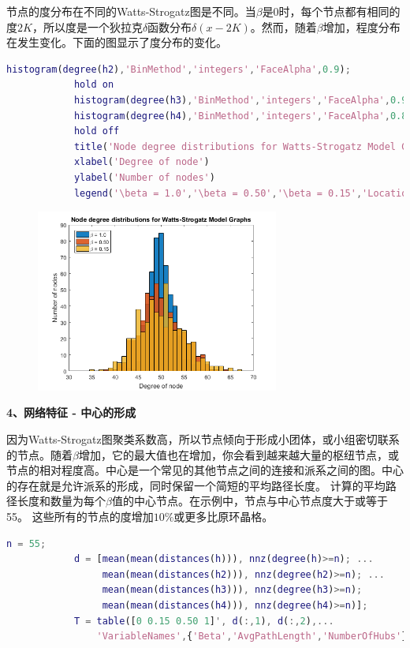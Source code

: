             \par
            节点的度分布在不同的Watts-Strogatz图是不同。当$\beta$是0时，每个节点都有相同的度$2K$，所以度是一个狄拉克$\delta$函数分布$\delta(x-2K)$。然而，随着$\beta$增加，程度分布在发生变化。下面的图显示了度分布的变化。
            \begin{lstlisting}[language=Matlab]
            histogram(degree(h2),'BinMethod','integers','FaceAlpha',0.9);
            hold on
            histogram(degree(h3),'BinMethod','integers','FaceAlpha',0.9);
            histogram(degree(h4),'BinMethod','integers','FaceAlpha',0.8);
            hold off
            title('Node degree distributions for Watts-Strogatz Model Graphs')
            xlabel('Degree of node')
            ylabel('Number of nodes')
            legend('\beta = 1.0','\beta = 0.50','\beta = 0.15','Location','NorthWest')
             \end{lstlisting}
            \begin{figure}[H]
            \centering
            \includegraphics[height=6cm]{images/40.jpg}
            \end{figure}
            \textbf{4、网络特征 - 中心的形成}
            \par
            因为Watts-Strogatz图聚类系数高，所以节点倾向于形成小团体，或小组密切联系的节点。随着$\beta$增加，它的最大值也在增加，你会看到越来越大量的枢纽节点，或节点的相对程度高。中心是一个常见的其他节点之间的连接和派系之间的图。中心的存在就是允许派系的形成，同时保留一个简短的平均路径长度。
            计算的平均路径长度和数量为每个$\beta$值的中心节点。在示例中，节点与中心节点度大于或等于55。 这些所有的节点的度增加$10\%$或更多比原环晶格。
            \begin{lstlisting}[language=Matlab]
            n = 55;
            d = [mean(mean(distances(h))), nnz(degree(h)>=n); ...
                 mean(mean(distances(h2))), nnz(degree(h2)>=n); ...
                 mean(mean(distances(h3))), nnz(degree(h3)>=n);
                 mean(mean(distances(h4))), nnz(degree(h4)>=n)];
            T = table([0 0.15 0.50 1]', d(:,1), d(:,2),...
                'VariableNames',{'Beta','AvgPathLength','NumberOfHubs'})
                 \end{lstlisting}
